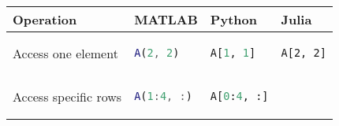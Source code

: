 \begin{tabular}[]{@{}llll@{}}
\toprule
\begin{minipage}[b]{0.23\columnwidth}\raggedright
Operation
\end{minipage} & \begin{minipage}[b]{0.23\columnwidth}\raggedright
MATLAB
\end{minipage} & \begin{minipage}[b]{0.23\columnwidth}\raggedright
Python
\end{minipage} & \begin{minipage}[b]{0.20\columnwidth}\raggedright
Julia
\end{minipage}\tabularnewline
\midrule
\begin{minipage}[t]{0.23\columnwidth}\raggedright
Access one element
\end{minipage} & \begin{minipage}[t]{0.23\columnwidth}\raggedright
\begin{lstlisting}[language=Matlab]
A(2, 2)
\end{lstlisting}

\end{minipage} & \begin{minipage}[t]{0.23\columnwidth}\raggedright
\begin{lstlisting}[language=Python]
A[1, 1]
\end{lstlisting}

\end{minipage} & \begin{minipage}[t]{0.20\columnwidth}\raggedright
\begin{lstlisting}
A[2, 2]
\end{lstlisting}

\end{minipage}\tabularnewline
\begin{minipage}[t]{0.23\columnwidth}\raggedright
Access specific rows
\end{minipage} & \begin{minipage}[t]{0.23\columnwidth}\raggedright
\begin{lstlisting}[language=Matlab]
A(1:4, :)
\end{lstlisting}

\end{minipage} & \begin{minipage}[t]{0.23\columnwidth}\raggedright
\begin{lstlisting}[language=Python]
A[0:4, :]
\end{lstlisting}


\end{minipage}
\end{tabular}
